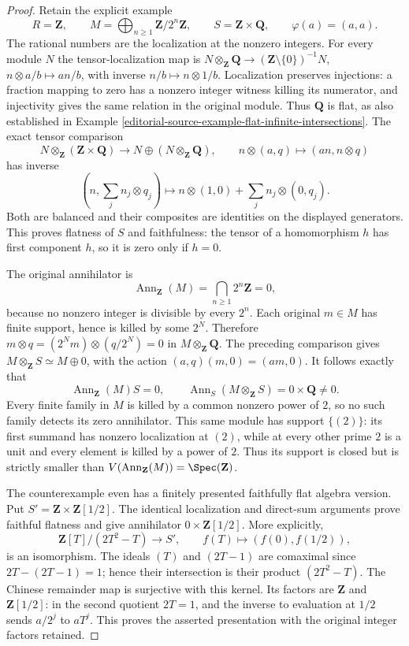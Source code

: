 \begin{proof}
Retain the explicit example
$$
R=\mathbf Z,\qquad
M=\bigoplus_{n\geq1}\mathbf Z/2^n\mathbf Z,\qquad
S=\mathbf Z\times\mathbf Q,
\qquad \varphi(a)=(a,a).
$$
The rational numbers are the localization at the nonzero
integers. For every module $N$ the tensor-localization map is
$N\otimes_{\mathbf Z}\mathbf Q\to
(\mathbf Z\setminus\{0\})^{-1}N$,
$n\otimes a/b\mapsto an/b$, with inverse $n/b\mapsto n\otimes1/b$.
Localization preserves injections: a fraction mapping to zero
has a nonzero integer witness killing its numerator, and
injectivity gives the same relation in the original module.
Thus $\mathbf Q$ is flat, as also established in
Example \ref{editorial-source-example-flat-infinite-intersections}.
The exact tensor comparison
$$
N\otimes_{\mathbf Z}(\mathbf Z\times\mathbf Q)
\longrightarrow N\oplus(N\otimes_{\mathbf Z}\mathbf Q),
\qquad n\otimes(a,q)\longmapsto(an,n\otimes q)
$$
has inverse
$$
\left(n,\sum_j n_j\otimes q_j\right)
\longmapsto n\otimes(1,0)+\sum_j n_j\otimes(0,q_j).
$$
Both are balanced and their composites are identities on
the displayed generators. This proves flatness of $S$ and
faithfulness: the tensor of a homomorphism $h$ has first
component $h$, so it is zero only if $h=0$.

The original annihilator is
$$
\operatorname{Ann}_{\mathbf Z}(M)
=\bigcap_{n\geq1}2^n\mathbf Z=0,
$$
because no nonzero integer is divisible by every $2^n$.
Each original $m\in M$ has finite support, hence is killed
by some $2^N$. Therefore
$m\otimes q=(2^Nm)\otimes(q/2^N)=0$ in
$M\otimes_{\mathbf Z}\mathbf Q$. The preceding comparison gives
$M\otimes_{\mathbf Z}S\simeq M\oplus0$, with the action
$(a,q)(m,0)=(am,0)$. It follows exactly that
$$
\operatorname{Ann}_{\mathbf Z}(M)S=0,
\qquad
\operatorname{Ann}_S(M\otimes_{\mathbf Z}S)=0\times\mathbf Q\ne0.
$$
Every finite family in $M$ is killed by a common nonzero
power of $2$, so no such family detects its zero annihilator.
This same module has support $\{(2)\}$: its first summand
has nonzero localization at $(2)$, while at every other
prime $2$ is a unit and every element is killed by a power
of $2$. Thus its support is closed but is strictly smaller
than $V(\operatorname{Ann}_{\mathbf Z}(M))=\Spec(\mathbf Z)$.

The counterexample even has a finitely presented faithfully
flat algebra version. Put $S'=\mathbf Z\times\mathbf Z[1/2]$.
The identical localization and direct-sum arguments prove
faithful flatness and give annihilator $0\times\mathbf Z[1/2]$.
More explicitly,
$$
\mathbf Z[T]/(2T^2-T)\longrightarrow S',
\qquad f(T)\longmapsto(f(0),f(1/2)),
$$
is an isomorphism. The ideals $(T)$ and $(2T-1)$ are
comaximal since $2T-(2T-1)=1$; hence their intersection
is their product $(2T^2-T)$. The Chinese remainder map
is surjective with this kernel. Its factors are $\mathbf Z$
and $\mathbf Z[1/2]$: in the second quotient $2T=1$, and
the inverse to evaluation at $1/2$ sends $a/2^j$ to $aT^j$.
This proves the asserted presentation with the original
integer factors retained.


\end{proof}

